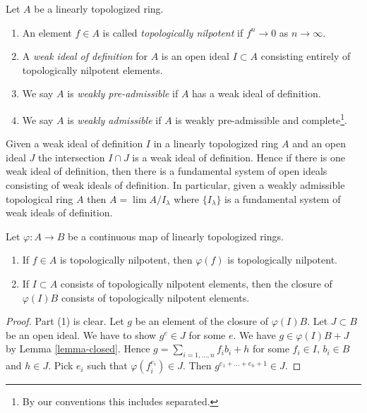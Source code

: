 \begin{definition}
\label{definition-weakly-admissible}
Let $A$ be a linearly topologized ring.
\begin{enumerate}
\item An element $f \in A$ is called {\it topologically nilpotent}
if $f^n \to 0$ as $n \to \infty$.
\item A {\it weak ideal of definition} for $A$ is an open ideal
$I \subset A$ consisting entirely of topologically nilpotent elements.
\item We say $A$ is {\it weakly pre-admissible} if $A$ has a weak
ideal of definition.
\item We say $A$ is {\it weakly admissible} if $A$ is weakly pre-admissible
and complete\footnote{By our conventions this includes separated.}.
\end{enumerate}
\end{definition}

\noindent
Given a weak ideal of definition $I$ in a linearly topologized ring
$A$ and an open ideal $J$ the intersection $I \cap J$ is a
weak ideal of definition. Hence if there is one weak ideal of definition,
then there is a fundamental system of open ideals
consisting of weak ideals of definition. In particular,
given a weakly admissible topological ring $A$ then
$A = \lim A/I_\lambda$ where $\{I_\lambda\}$ is a fundamental system
of weak ideals of definition.

\begin{lemma}
\label{lemma-topologically-nilpotent}
Let $\varphi : A \to B$ be a continuous map of linearly topologized rings.
\begin{enumerate}
\item If $f \in A$ is topologically nilpotent, then $\varphi(f)$ is
topologically nilpotent.
\item If $I \subset A$ consists of topologically nilpotent elements,
then the closure of $\varphi(I)B$ consists of topologically nilpotent
elements.
\end{enumerate}
\end{lemma}

\begin{proof}
Part (1) is clear. Let $g$ be an element of the closure of $\varphi(I)B$.
Let $J \subset B$ be an open ideal. We have to show $g^e \in J$ for some $e$.
We have $g \in \varphi(I)B + J$ by Lemma \ref{lemma-closed}.
Hence $g = \sum_{i = 1, \ldots, n} f_ib_i + h$ for some $f_i \in I$,
$b_i \in B$ and $h \in J$. Pick $e_i$ such that
$\varphi(f_i^{e_i}) \in J$. Then $g^{e_1 + \ldots + e_n + 1} \in J$.
\end{proof}

